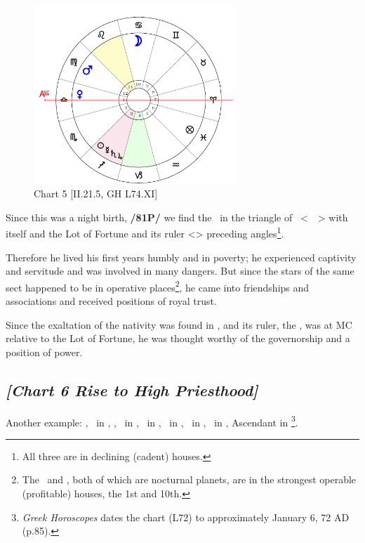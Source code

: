 \clearpage
\begin{figure}
\centering
\includegraphics[width=0.68\textwidth]{charts/2_21_5}
\caption{Chart 5 [II.21.5, GH L74.XI]}
\label{fig:chart05}
\end{figure}

Since this was a night birth, \textbf{/81P/} we find the \Moon\, in the triangle of \Mars\, <\Cancer\, \Scorpio\, \Pisces> with \Mars\, itself and the Lot of Fortune and its ruler <\Jupiter> preceding angles\footnote{All three are in declining (cadent) houses.}.

Therefore he lived his first years humbly and in poverty; he experienced captivity and servitude and was involved in many dangers. But since the stars of the same sect happened to be in operative places\footnote{The \Moon\, and \Venus, both of which are nocturnal planets, are in the strongest operable (profitable) houses, the 1st and 10th.}, he came into friendships and associations and received positions of royal trust. 

Since the exaltation of the nativity was found in \Leo, and its ruler, the \Sun, was at MC relative to the Lot of Fortune, he was thought worthy of the governorship and a position of power.
\newpage

\subsection*{\textit{[Chart 6 Rise to High Priesthood]}}

Another example: \Sun, \Mercury\, in \Capricorn, \Moon, \Venus\, in \Sagittarius, \Saturn\, in \Scorpio,
\Jupiter\, in \Libra, \Mars\, in \Aquarius, \Fortune \, in \Aries, Ascendant in \Taurus
\footnote{\textit{Greek Horoscopes} dates the chart (L72) to approximately January 6, 72 AD (p.85).}.

